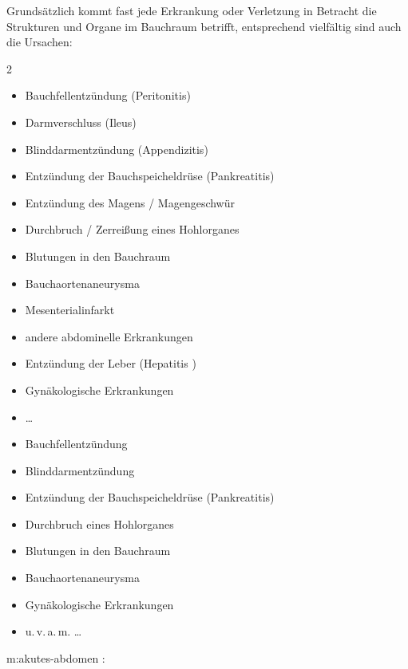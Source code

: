 {%
Grundsätzlich kommt fast jede Erkrankung oder Verletzung in
Betracht die Strukturen und Organe im Bauchraum betrifft,
entsprechend vielfältig sind auch die Ursachen: 

\begin{multicols}{2}
\FormatTable
\begin{itemize}
  \item Bauchfellentzündung (Peritonitis)
  \item Darmverschluss (Ileus)
  \item Blinddarmentzündung (Appendizitis)
  \item Entzündung der Bauchspeicheldrüse  (Pankreatitis)
  \item Entzündung des Magens / Magengeschwür
  \item Durchbruch / Zerreißung eines Hohlorganes
  \item Blutungen in den Bauchraum
  \item Bauchaortenaneurysma
  \item Mesenterialinfarkt
  \item andere abdominelle Erkrankungen
  \item Entzündung der Leber (Hepatitis )
  \item Gynäkologische Erkrankungen
  \item \ldots
\end{itemize}
\end{multicols}
}{
\begin{itemize}
  \item Bauchfellentzündung 
  \item Blinddarmentzündung 
  \item Entzündung der Bauchspeicheldrüse  (Pankreatitis)
  \item Durchbruch eines Hohlorganes
  \item Blutungen in den Bauchraum
  \item Bauchaortenaneurysma
  \item Gynäkologische Erkrankungen
  \item u.\,v.\,a.\,m. \ldots
\end{itemize}
}{}{}{}



{m:akutes-abdomen}{
: 
}{}

